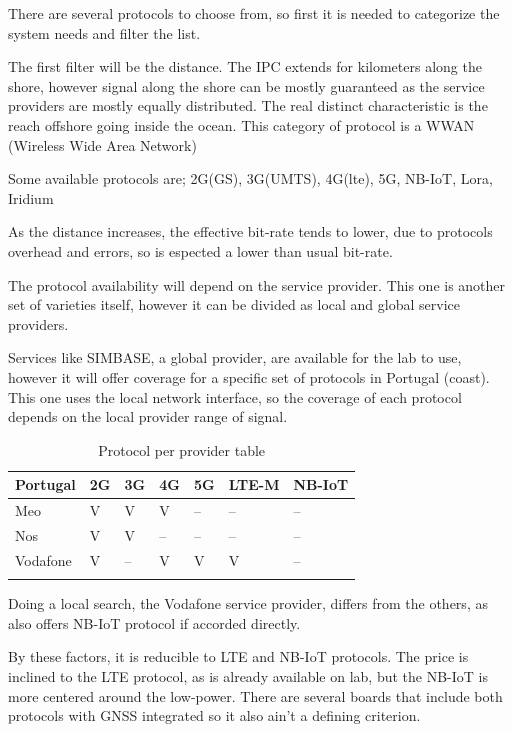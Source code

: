 There are several protocols to choose from, so first it is needed to categorize the 
system needs and filter the list.

The first filter will be the distance. The IPC extends for kilometers along the shore, 
however signal along the shore can be mostly guaranteed as the service providers are 
mostly equally distributed. The real distinct characteristic is the reach offshore 
going inside the ocean. This category of protocol is a WWAN (Wireless Wide Area Network)

Some available protocols are; 2G(GS), 3G(UMTS), 4G(\acrshort{lte}), 5G, NB-IoT, Lora, Iridium

As the distance increases, the effective bit-rate tends to lower, due to protocols 
overhead and errors, so is espected a lower than usual bit-rate.

The protocol availability will depend on the service provider. This one is another set of
varieties itself, however it can be divided as local and global service providers. 

Services like SIMBASE, a global provider, are available for the lab to use, however it will offer coverage for 
a specific set of protocols in Portugal (coast). This one uses the local network interface,
so the coverage of each protocol depends on the local provider range of signal.

\begin{table}[h!]
    \centering
    \begin{tabular}{l|l|l|l|l|l|l}
        \textbf{Portugal} & \textbf{2G} & \textbf{3G} & \textbf{4G} & \textbf{5G} & \textbf{LTE-M} & \textbf{NB-IoT} \\
        \hline
        \arrayrulecolor[gray]{0.85}
        Meo      & V  & V  & V  & -- & -- & -- \\
        \hline
        Nos      & V  & V  & -- & -- & -- & -- \\
        \hline
        Vodafone & V  & -- & V  & V  & V  & -- \\
        \arrayrulecolor{black}
    \end{tabular}
    \caption{Protocol per provider table}
    \label{table:protocol_per_provider}
\end{table}


Doing a local search, the Vodafone service provider, differs from the others, as
also offers NB-IoT protocol if accorded directly.

By these factors, it is reducible to LTE and NB-IoT protocols. The price is inclined to
the LTE protocol, as is already available on lab, but the NB-IoT is more centered 
around the low-power. There are several boards that include both protocols with GNSS 
integrated so it also ain't a defining criterion.

